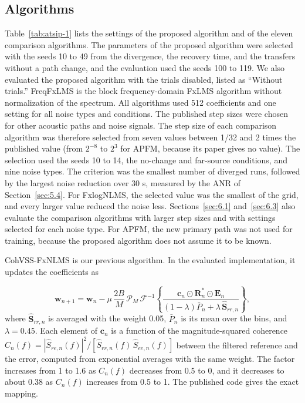 \documentclass[sip,biber]{now-journal}
\begin{document}
\hypertarget{sec:5.3}{%
\subsection{Algorithms}\label{sec:5.3}}



Table~\ref{tab:atsip-1} lists the settings of the proposed algorithm and of the eleven comparison algorithms. The parameters of the proposed algorithm were selected with the seeds 10 to 49 from the divergence, the recovery time, and the transfers without a path change, and the evaluation used the seeds 100 to 119. We also evaluated the proposed algorithm with the trials disabled, listed as ``Without trials.'' FreqFxLMS \cite{das2007} is the block frequency-domain FxLMS algorithm without normalization of the spectrum. All algorithms used 512 coefficients and one setting for all noise types and conditions. The published step sizes were chosen for other acoustic paths and noise signals. The step size of each comparison algorithm was therefore selected from seven values between 1/32 and 2 times the published value (from \(2^{-8}\) to \(2^{3}\) for APFM, because its paper gives no value). The selection used the seeds 10 to 14, the no-change and far-source conditions, and nine noise types. The criterion was the smallest number of diverged runs, followed by the largest noise reduction over 30 s, measured by the ANR of Section~\ref{sec:5.4}. For FxlogNLMS, the selected value was the smallest of the grid, and every larger value reduced the noise less. Sections~\ref{sec:6.1} and~\ref{sec:6.3} also evaluate the comparison algorithms with larger step sizes and with settings selected for each noise type. For APFM, the new primary path was not used for training, because the proposed algorithm does not assume it to be known.

CohVSS-FxNLMS \cite{sugiura2026} is our previous algorithm. In the evaluated implementation, it updates the coefficients as

\begin{equation}\label{eq:13}\mathbf{w}_{n+1} = \mathbf{w}_n - \mu\,\frac{2B}{M}\,\mathcal{P}_M\,\mathcal{F}^{-1}\!\left\{ \frac{\mathbf{c}_n \odot \mathbf{R}_n^{*} \odot \mathbf{E}_n}{(1-\lambda)\bar{P}_n + \lambda\,\hat{\mathbf{S}}_{rr,n}} \right\},\end{equation} where \(\hat{\mathbf{S}}_{rr,n}\) is averaged with the weight 0.05, \(\bar{P}_n\) is its mean over the bins, and \(\lambda = 0.45\). Each element of \(\mathbf{c}_n\) is a function of the magnitude-squared coherence \(C_n(f) = |\hat{S}_{re,n}(f)|^2 / [\hat{S}_{rr,n}(f)\,\hat{S}_{ee,n}(f)]\) between the filtered reference and the error, computed from exponential averages with the same weight. The factor increases from 1 to 1.6 as \(C_n(f)\) decreases from 0.5 to 0, and it decreases to about 0.38 as \(C_n(f)\) increases from 0.5 to 1. The published code gives the exact mapping.
\end{document}
